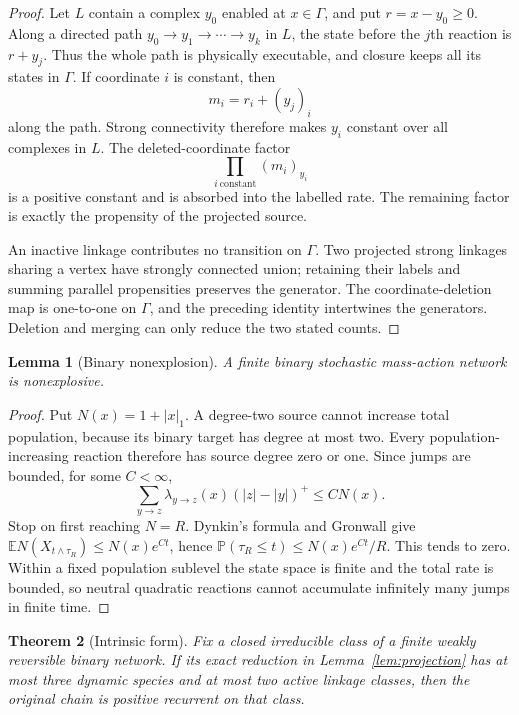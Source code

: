 \documentclass[11pt]{article}
\newtheorem{theorem}{Theorem}[section]
\newtheorem{lemma}[theorem]{Lemma}
\theoremstyle{definition}
\theoremstyle{remark}
\newcommand{\1}{\mathbf 1}
\begin{document}
\begin{proof}
Let $L$ contain a complex $y_0$ enabled at $x\in\Gamma$, and put
$r=x-y_0\ge0$.  Along a directed path
$y_0\to y_1\to\cdots\to y_k$ in $L$, the state before the $j$th reaction is
$r+y_j$.  Thus the whole path is physically executable, and closure keeps all
its states in $\Gamma$.  If coordinate $i$ is constant, then
\[
             m_i=r_i+(y_j)_i
\]
along the path.  Strong connectivity therefore makes $y_i$ constant over all
complexes in $L$.  The deleted-coordinate factor
\[
          \prod_{i\ \mathrm{constant}}(m_i)_{y_i}
\]
is a positive constant and is absorbed into the labelled rate.  The remaining
factor is exactly the propensity of the projected source.

An inactive linkage contributes no transition on $\Gamma$.  Two projected
strong linkages sharing a vertex have strongly connected union; retaining
their labels and summing parallel propensities preserves the generator.
The coordinate-deletion map is one-to-one on $\Gamma$, and the preceding
identity intertwines the generators.  Deletion and merging can only reduce
the two stated counts.
\end{proof}

\begin{lemma}[Binary nonexplosion]\label{lem:nonexplosion}
A finite binary stochastic mass-action network is nonexplosive.
\end{lemma}

\begin{proof}
Put $N(x)=1+|x|_1$.  A degree-two source cannot increase total population,
because its binary target has degree at most two.  Every population-increasing
reaction therefore has source degree zero or one.  Since jumps are bounded,
for some $C<\infty$,
\begin{equation}\label{eq:linear-growth}
 \sum_{y\to z}\lambda_{y\to z}(x)(|z|-|y|)^+\le CN(x).
\end{equation}
Stop on first reaching $N=R$.  Dynkin's formula and Gronwall give
$\mathbb E N(X_{t\wedge\tau_R})\le N(x)e^{Ct}$, hence
$\mathbb P(\tau_R\le t)\le N(x)e^{Ct}/R$.  This tends to zero.  Within a
fixed population sublevel the state space is finite and the total rate is
bounded, so neutral quadratic reactions cannot accumulate infinitely many
jumps in finite time.
\end{proof}

\begin{theorem}[Intrinsic form]\label{thm:intrinsic}
Fix a closed irreducible class of a finite weakly reversible binary network.
If its exact reduction in Lemma~\ref{lem:projection} has at most three dynamic
species and at most two active linkage classes, then the original chain is
positive recurrent on that class.
\end{theorem}
\end{document}
